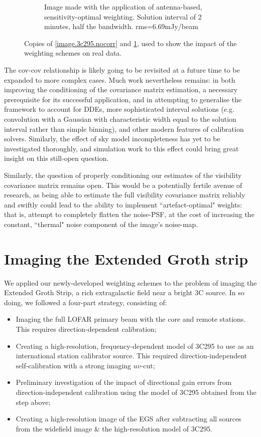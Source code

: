 \begin{figure}[h!]
\begin{subfigure}{.49\textwidth}
\caption{\label{image.3c295.antcorr1} Image made with the application of antenna-based, sensitivity-optimal weighting. Solution interval of 2 minutes, half the bandwidth. rms=6.69mJy/beam}
\end{subfigure}
\caption{\label{stuff} Copies of \cref{image.3c295.nocorr} and \cref{image.3c295.antcorr1}, used to show the impact of the weighting schemes on real data.}
\end{figure}

\pg
The cov-cov relationship is likely going to be revisited at a future time to be expanded to more complex cases. Much work nevertheless remains: in both improving the conditioning of the covariance matrix estimation, a necessary prerequisite for its successful application, and in attempting to generalise the framework to account for DDEs, more sophisticated interval solutions (e.g. convolution with a Gaussian with characteristic width equal to the solution interval rather than simple binning), and other modern features of calibration solvers. Similarly, the effect of sky model incompleteness has yet to be investigated thoroughly, and simulation work to this effect could bring great insight on this still-open question.

\pg
Similarly, the question of properly conditioning our estimates of the visibility covariance matrix remains open. This would be a potentially fertile avenue of research, as being able to estimate the full visibility covariance matrix reliably and swiftly could lead to the ability to implement ``artefact-optimal" weights: that is, attempt to completely flatten the noise-PSF, at the cost of increasing the constant, ``thermal" noise component of the image's noise-map.



\section{Imaging the Extended Groth strip}

\pg
We applied our newly-developed weighting schemes to the problem of imaging the Extended Groth Strip, a rich extragalactic field near a bright 3C source. In so doing, we followed a four-part strategy, consisting of:
\begin{itemize}
\item Imaging the full LOFAR primary beam with the core and remote stations. This requires direction-dependent calibration;
\item Creating a high-resolution, frequency-dependent model of 3C295 to use as an international station calibrator source. This required direction-independent self-calibration with a strong imaging $uv$-cut;
\item Preliminary investigation of the impact of directional gain errors from direction-independent calibration using the model of 3C295 obtained from the step above;
\item Creating a high-resolution image of the EGS after subtracting all sources from the widefield image \& the high-resolution model of 3C295.
\end{itemize}

